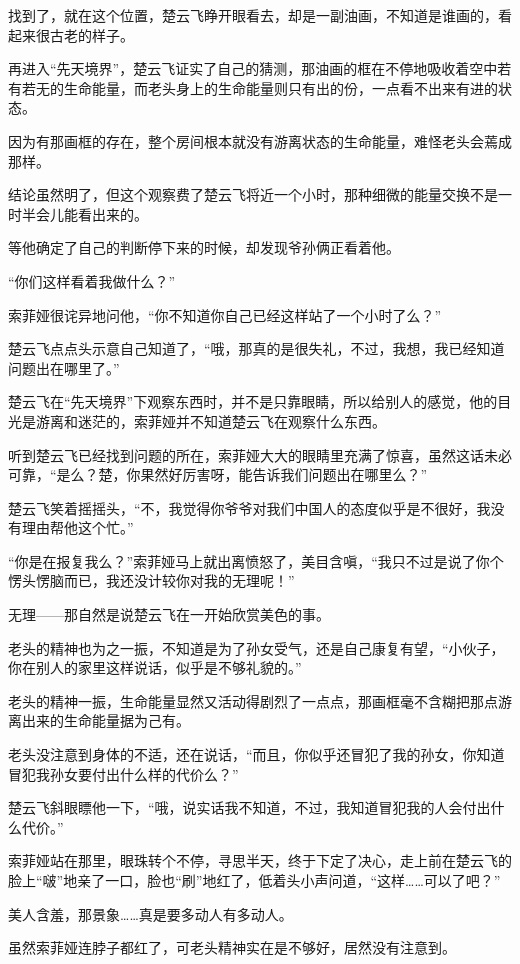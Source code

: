 找到了，就在这个位置，楚云飞睁开眼看去，却是一副油画，不知道是谁画的，看起来很古老的样子。

再进入“先天境界”，楚云飞证实了自己的猜测，那油画的框在不停地吸收着空中若有若无的生命能量，而老头身上的生命能量则只有出的份，一点看不出来有进的状态。

因为有那画框的存在，整个房间根本就没有游离状态的生命能量，难怪老头会蔫成那样。

结论虽然明了，但这个观察费了楚云飞将近一个小时，那种细微的能量交换不是一时半会儿能看出来的。

等他确定了自己的判断停下来的时候，却发现爷孙俩正看着他。

“你们这样看着我做什么？”

索菲娅很诧异地问他，“你不知道你自己已经这样站了一个小时了么？”

楚云飞点点头示意自己知道了，“哦，那真的是很失礼，不过，我想，我已经知道问题出在哪里了。”

楚云飞在“先天境界”下观察东西时，并不是只靠眼睛，所以给别人的感觉，他的目光是游离和迷茫的，索菲娅并不知道楚云飞在观察什么东西。

听到楚云飞已经找到问题的所在，索菲娅大大的眼睛里充满了惊喜，虽然这话未必可靠，“是么？楚，你果然好厉害呀，能告诉我们问题出在哪里么？”

楚云飞笑着摇摇头，“不，我觉得你爷爷对我们中国人的态度似乎是不很好，我没有理由帮他这个忙。”

“你是在报复我么？”索菲娅马上就出离愤怒了，美目含嗔，“我只不过是说了你个愣头愣脑而已，我还没计较你对我的无理呢！”

无理——那自然是说楚云飞在一开始欣赏美色的事。

老头的精神也为之一振，不知道是为了孙女受气，还是自己康复有望，“小伙子，你在别人的家里这样说话，似乎是不够礼貌的。”

老头的精神一振，生命能量显然又活动得剧烈了一点点，那画框毫不含糊把那点游离出来的生命能量据为己有。

老头没注意到身体的不适，还在说话，“而且，你似乎还冒犯了我的孙女，你知道冒犯我孙女要付出什么样的代价么？”

楚云飞斜眼瞟他一下，“哦，说实话我不知道，不过，我知道冒犯我的人会付出什么代价。”

索菲娅站在那里，眼珠转个不停，寻思半天，终于下定了决心，走上前在楚云飞的脸上“啵”地亲了一口，脸也“刷”地红了，低着头小声问道，“这样……可以了吧？”

美人含羞，那景象……真是要多动人有多动人。

虽然索菲娅连脖子都红了，可老头精神实在是不够好，居然没有注意到。


